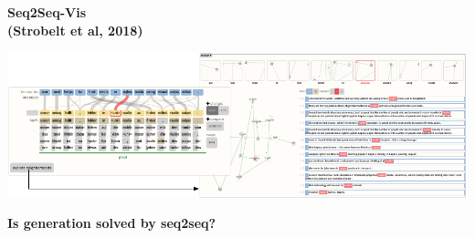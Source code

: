 \documentclass[aspectratio=169]{beamer}
\begin{document}
\begin{frame}
  \begin{center}
    \textbf{Seq2Seq-Vis \\ {\small (Strobelt et al, 2018)} }
  \end{center}

  \includegraphics[width=\textwidth]{s2stease}
\end{frame}

\begin{frame}
  \begin{center}
    \textbf{Is generation solved by seq2seq? }
  \end{center}
\end{frame}
\end{document}
